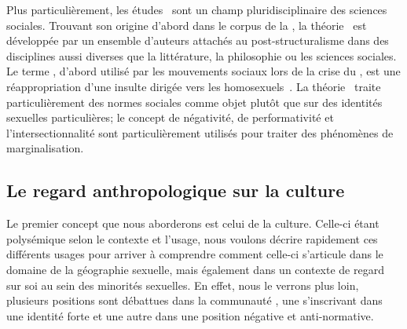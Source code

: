 Plus particulièrement, les études \qus\ sont un champ pluridisciplinaire des sciences sociales. 
Trouvant son origine d'abord dans le corpus de la , la théorie \qu\ est développée par un ensemble d'auteurs attachés au post-structuralisme dans des disciplines aussi diverses que la littérature, la philosophie ou les sciences sociales. 
Le terme \qu, d'abord utilisé par les mouvements sociaux \lgbt{} lors de la crise du \sida, est une réappropriation d'une insulte dirigée vers les homosexuels~\citep{Laprade2014}.
La théorie \qu\ traite particulièrement des normes sociales comme objet plutôt que sur des identités sexuelles particulières; le concept de négativité, de performativité et l'intersectionnalité sont particulièrement utilisés pour traiter des phénomènes de marginalisation.

\subsection{Le regard anthropologique sur la culture}
\label{subsec:le_regard_anthropologique_sur_la_culture} 
Le premier concept que nous aborderons est celui de la culture. 
Celle-ci étant polysémique selon le contexte et l'usage, nous voulons décrire rapidement ces différents usages pour arriver à comprendre comment celle-ci s'articule dans le domaine de la géographie sexuelle, mais également dans un contexte de regard sur soi au sein des minorités sexuelles. 
En effet, nous le verrons plus loin, plusieurs positions sont débattues dans la communauté \lgbt{}, une s'inscrivant dans une identité forte et une autre dans une position négative et anti-normative.


